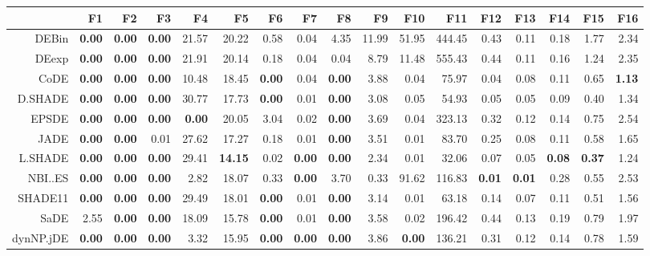 \begin{table}[h!]
\centering
\begingroup\tiny
\begin{tabular}{rrrrrrrrrrrrrrrrr}
  \hline
 & F1 & F2 & F3 & F4 & F5 & F6 & F7 & F8 & F9 & F10 & F11 & F12 & F13 & F14 & F15 & F16 \\ 
  \hline
DEBin & \textbf{0.00} & \textbf{0.00} & \textbf{0.00} & 21.57 & 20.22 & 0.58 & 0.04 & 4.35 & 11.99 & 51.95 & 444.45 & 0.43 & 0.11 & 0.18 & 1.77 & 2.34 \\ 
  DEexp & \textbf{0.00} & \textbf{0.00} & \textbf{0.00} & 21.91 & 20.14 & 0.18 & 0.04 & 0.04 & 8.79 & 11.48 & 555.43 & 0.44 & 0.11 & 0.16 & 1.24 & 2.35 \\ 
  CoDE & \textbf{0.00} & \textbf{0.00} & \textbf{0.00} & 10.48 & 18.45 & \textbf{0.00} & 0.04 & \textbf{0.00} & 3.88 & 0.04 & 75.97 & 0.04 & 0.08 & 0.11 & 0.65 & \textbf{1.13} \\ 
  D.SHADE & \textbf{0.00} & \textbf{0.00} & \textbf{0.00} & 30.77 & 17.73 & \textbf{0.00} & 0.01 & \textbf{0.00} & 3.08 & 0.05 & 54.93 & 0.05 & 0.05 & 0.09 & 0.40 & 1.34 \\ 
  EPSDE & \textbf{0.00} & \textbf{0.00} & \textbf{0.00} & \textbf{0.00} & 20.05 & 3.04 & 0.02 & \textbf{0.00} & 3.69 & 0.04 & 323.13 & 0.32 & 0.12 & 0.14 & 0.75 & 2.54 \\ 
  JADE & \textbf{0.00} & \textbf{0.00} & 0.01 & 27.62 & 17.27 & 0.18 & 0.01 & \textbf{0.00} & 3.51 & 0.01 & 83.70 & 0.25 & 0.08 & 0.11 & 0.58 & 1.65 \\ 
  L.SHADE & \textbf{0.00} & \textbf{0.00} & \textbf{0.00} & 29.41 & \textbf{14.15} & 0.02 & \textbf{0.00} & \textbf{0.00} & 2.34 & 0.01 & 32.06 & 0.07 & 0.05 & \textbf{0.08} & \textbf{0.37} & 1.24 \\ 
  NBI..ES & \textbf{0.00} & \textbf{0.00} & \textbf{0.00} & 2.82 & 18.07 & 0.33 & \textbf{0.00} & 3.70 & 0.33 & 91.62 & 116.83 & \textbf{0.01} & \textbf{0.01} & 0.28 & 0.55 & 2.53 \\ 
  SHADE11 & \textbf{0.00} & \textbf{0.00} & \textbf{0.00} & 29.49 & 18.01 & \textbf{0.00} & 0.01 & \textbf{0.00} & 3.14 & 0.01 & 63.18 & 0.14 & 0.07 & 0.11 & 0.51 & 1.56 \\ 
  SaDE & 2.55 & \textbf{0.00} & \textbf{0.00} & 18.09 & 15.78 & \textbf{0.00} & 0.01 & \textbf{0.00} & 3.58 & 0.02 & 196.42 & 0.44 & 0.13 & 0.19 & 0.79 & 1.97 \\ 
  dynNP.jDE & \textbf{0.00} & \textbf{0.00} & \textbf{0.00} & 3.32 & 15.95 & \textbf{0.00} & \textbf{0.00} & \textbf{0.00} & 3.86 & \textbf{0.00} & 136.21 & 0.31 & 0.12 & 0.14 & 0.78 & 1.59 \\ 

\end{tabular}
\end{table}
